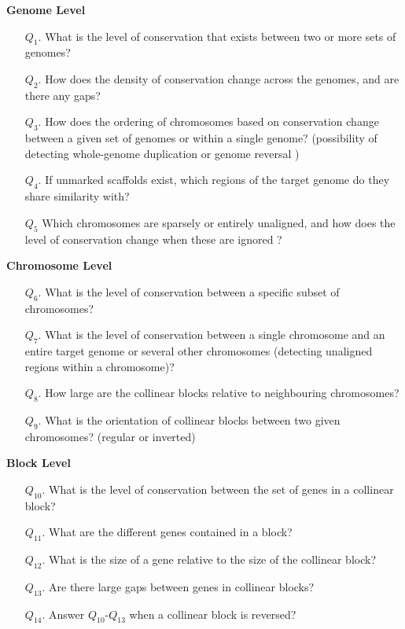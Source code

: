 \smallskip
\noindent
\textbf{Genome Level}
\smallskip
\begin{enumerate}
\item [$Q_1$.] What is the level of conservation that exists between two or more sets of genomes?
\item [$Q_2$.] How does the density of conservation change across the genomes, and are there any gaps?
\item [$Q_3$.] How does the ordering of chromosomes based on conservation change between a given set of genomes or within a single genome? (possibility of detecting whole-genome duplication or genome reversal )
\item [$Q_4$.] If unmarked scaffolds exist, which regions of the target genome do they share similarity with?
\item[$Q_5$] Which chromosomes are sparsely or entirely unaligned, and how does the level of conservation change when these are ignored ?
\end{enumerate}

\smallskip
\noindent
\textbf{Chromosome Level}
\smallskip
\begin{enumerate}
\item [$Q_6$.]What is the level of conservation between a specific subset of chromosomes?
\item [$Q_7$.] What is the level of conservation between a single chromosome and an entire target genome or several other chromosomes (detecting unaligned regions within a chromosome)?
\item [$Q_8$.] 
How large are the collinear blocks relative to neighbouring chromosomes?
\item [$Q_9$.]What is the orientation of collinear blocks between two given chromosomes? (regular or inverted)
\end{enumerate}

\smallskip
\noindent
\textbf{Block Level}
\smallskip
\begin{enumerate}
\item [$Q_{10}$.]What is the level of conservation between the set of genes in a collinear block?
\item [$Q_{11}$.] What are the different genes contained in a block?
\item [$Q_{12}$.] What is the size of a gene relative to the size of the collinear block?
\item [$Q_{13}$.] Are there large gaps between genes in collinear blocks?
\item [$Q_{14}$.] Answer $Q_{10}$-$Q_{13}$ when a collinear block is reversed?
\end{enumerate}


